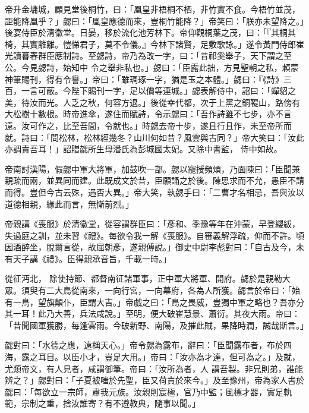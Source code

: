 \begin{pinyinscope}
 帝升金墉城，顧見堂後桐竹，曰：「凰皇非梧桐不栖，非竹實不食。今梧竹並茂，詎能降凰乎？」勰曰：「凰皇應德而來，豈桐竹能降？」帝笑曰：「朕亦未望降之。」後宴侍臣於清徽堂。日晏，移於流化池芳林下。帝仰觀桐葉之茂，曰：「『其桐其椅，其實離離。愷悌君子，莫不令儀。』今林下諸賢，足敷歌詠。」遂令黃門侍郎崔光讀暮春群臣應制詩。至勰詩，帝乃為改一字，曰：「昔祁奚舉子，天下謂之至公。今見勰詩，始知中
 令之舉非私也。」勰曰：「臣露此拙，方見聖朝之私，賴蒙神筆賜刊，得有令譽。」帝曰：「雖琱琢一字，猶是玉之本體。」勰曰：『《詩》三百，一言可蔽。今陛下賜刊一字，足以價等連城。」勰表解侍中，詔曰：「蟬貂之美，待汝而光。人乏之秋，何容方退。」後從幸代都，次于上黨之銅鞮山，路傍有大松樹十數根。時帝進傘，遂住而賦詩，令示勰曰：「吾作詩雖不七步，亦不言遠。汝可作之，比至吾間，令就也。」時勰去帝十步，遂且行且作，未至帝所而就。詩曰：「問松林，松林經幾冬？山川何如昔？風雲與古同？」帝大笑曰：「汝此亦調責吾耳！」詔贈勰所生母潘氏為彭城國太妃。又除中書監，
 侍中如故。



 帝南討漢陽，假勰中軍大將軍，加鼓吹一部。勰以寵授頻煩，乃面陳曰：「臣聞兼親疏而兩，並異同而建。此既成文於昔，臣願誦之於後。陳思求而不允，愚臣不請而得。豈但今古云殊，遇否大異。」帝大笑，執勰手曰：「二曹才名相忌，吾與汝以道德相親，緣此而言，無慚前烈。」



 帝親講《喪服》於清徽堂，從容謂群臣曰：「彥和、季豫等年在沖蒙，早登纓紱，失過庭之訓，並未習《禮》。每欲令我一解《喪服》。自審義解浮疏，仰而不許。頃因酒醉坐，脫爾言從，故屈朝彥，遂親傅說。」御史中尉李彪對曰：「自古及今，未有天子講《禮》。臣得親承音旨，千載一時。」



 從征沔北，
 除使持節、都督南征諸軍事，正中軍大將軍、開府。勰於是親勒大眾。須臾有二大鳥從南來，一向行宮，一向幕府，各為人所獲。勰言於帝曰：「始有一鳥，望旗顛仆，臣謂大吉。」帝戲之曰：「鳥之畏威，豈獨中軍之略也？吾亦分其一耳！此乃大善，兵法咸說。」至明，便大破崔慧景、蕭衍。其夜大雨。帝曰：「昔聞國軍獲勝，每逢雲雨。今破新野、南陽，及摧此賊，果降時潤，誠哉斯言。」



 勰對曰：「水德之應，遠稱天心。」帝令勰為露布，辭曰：「臣聞露布者，布於四海，露之耳目。以臣小才，豈足大用。」帝曰：「汝亦為才達，但可為之。」及就，尤類帝文，有人見者，咸謂御筆。帝曰：「汝所為者，人
 謂吾製。非兄則弟，誰能辨之？」勰對曰：「子夏被嗤於先聖，臣又荷責於來今。」及至豫州，帝為家人書於勰曰：「每欲立一宗師，肅我元族。汝親則宸極，官乃中監；風標才器，實足軌範，宗制之重，捨汝誰寄？有不遵教典，隨事以聞。」




\end{pinyinscope}

